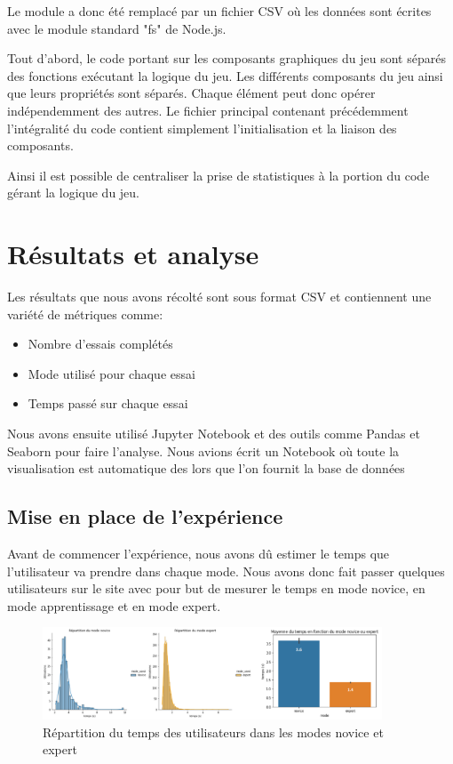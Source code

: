 \documentclass[a4paper, 12pt]{report}
\begin{document}
        Le module a donc été remplacé par un fichier CSV où les données sont écrites avec le module 
        standard "fs" de Node.js.
        
        Tout d'abord, le code portant sur les composants graphiques du jeu sont séparés des fonctions 
        exécutant la logique du jeu. 
        Les différents composants du jeu ainsi que leurs propriétés sont séparés. 
        Chaque élément peut donc opérer indépendemment des autres.
        Le fichier principal contenant précédemment l'intégralité du code contient simplement 
        l'initialisation et la liaison des composants.
        
        Ainsi il est possible de centraliser la prise de statistiques à la portion du code gérant la logique du jeu.

    
    \section{Résultats et analyse}
    Les résultats que nous avons récolté sont sous format CSV et contiennent une variété de métriques comme:
    \begin{itemize}
        \item Nombre d'essais complétés
        \item Mode utilisé pour chaque essai
        \item Temps passé sur chaque essai
    \end{itemize}
    
    Nous avons ensuite utilisé Jupyter Notebook et des outils comme Pandas et Seaborn pour faire l'analyse.
    Nous avions écrit un Notebook où toute la visualisation est automatique des lors que l'on fournit la base de données
    
        \subsection{Mise en place de l'expérience}
        Avant de commencer l'expérience, nous avons dû estimer le temps que l'utilisateur va prendre dans 
        chaque mode. Nous avons donc fait passer quelques utilisateurs sur le site avec pour but de mesurer le temps en mode novice, en mode apprentissage et en mode expert.
        
        \begin{figure}[H]
            \centering
            \includegraphics[width=0.9\textwidth]{img/fig4.png}
            \caption{Répartition du temps des utilisateurs dans les modes novice et expert}
        \end{figure}
        
\end{document}
